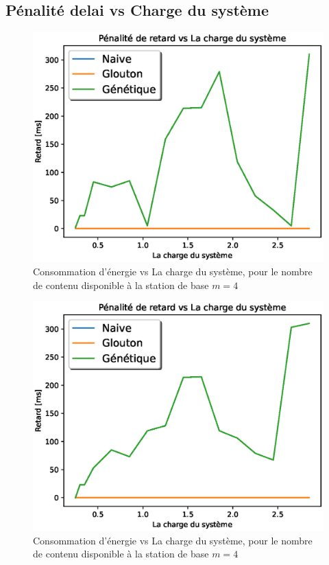 \documentclass[runningheads]{llncs}
\begin{document}
\subsection{Pénalité delai vs Charge du syst\`eme}
\begin{figure}[H]
    \includegraphics[width=\textwidth]{DvsL1.eps}
    \caption{Consommation d'énergie vs La charge du système, pour 
    le nombre de contenu disponible \`a la station de base $m=4$} 
    \label{fig:dvslm1}
\end{figure}
\begin{figure}[H]
    \includegraphics[width=\textwidth]{DvsL4.eps}
    \caption{Consommation d'énergie vs La charge du système, pour 
    le nombre de contenu disponible \`a la station de base $m=4$} 
    \label{fig:dvslm4}
\end{figure}






\end{document}
